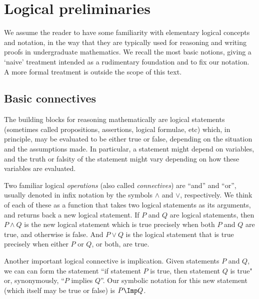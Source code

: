 
\section{Logical preliminaries}
\label{sec:logical-prelim}

We assume the reader to have some familiarity with elementary logical concepts and notation, in the way that they are typically used for reasoning and writing proofs in undergraduate mathematics.
We recall the most basic notions, giving a `naive' treatment  intended as a rudimentary foundation and to fix our notation.
A more formal treatment is outside the scope of this text.

\subsection{Basic connectives}

The building blocks for reasoning mathematically are logical statements (sometimes called propositions, assertions, logical formulae, etc) which, in principle, may be evaluated to be either true or false, depending on the situation and the assumptions made.
In particular, a statement might depend on variables, and the truth or falsity of the statement might vary depending on how these variables are evaluated.

Two familiar logical \emph{operations} (also called \emph{connectives}) are ``and'' and ``or'', usually denoted in infix notation by the symbols $\wedge$ and $\vee$, respectively.
We think of each of these as a function that takes two logical statements as its arguments, and returns back a new logical statement.
If $P$ and $Q$ are logical statements, then $P \wedge Q$ is the new logical statement which is true precisely when both $P$ and $Q$ are true, and otherwise is false.
And $P \vee Q$ is the logical statement that is true precisely when either $P$ or $Q$, or both, are true.

Another important logical connective is implication.
Given statements $P$ and $Q$, we can can form the statement ``if statement $P$ is true, then statement $Q$ is true" or, synonymously, ``$P$ implies $Q$''.
Our symbolic notation for this new statement (which itself may be true or false) is $P \Imp Q$.



